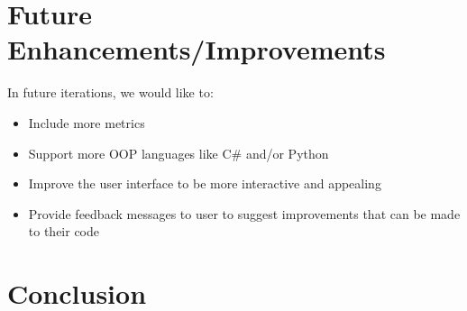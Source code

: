 \documentclass{scrreprt}
\begin{document}
	{\let\clearpage\relax\pagebreak \chapter{Future Enhancements/Improvements}}
	In future iterations, we would like to:\\
	
	\begin{itemize}
		\item Include more metrics
		\item Support more OOP languages like C\# and/or Python
		\item Improve the user interface to be more interactive and appealing
		\item Provide feedback messages to user to suggest improvements that can be made to their code
	\end{itemize}
	
	


	{\let\clearpage\relax \chapter{Conclusion}}
	
	 
\end{document}
